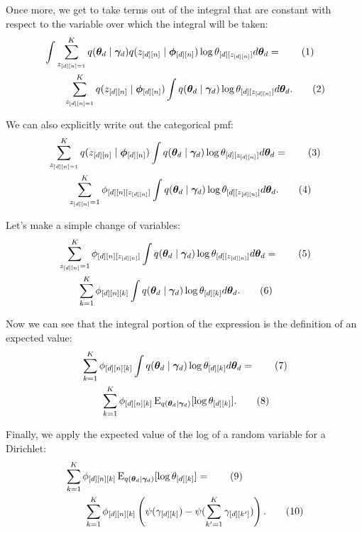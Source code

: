 \documentclass[12pt]{article}
\newcommand\numberthis{\addtocounter{equation}{1}\tag{\theequation}}
\newcommand{\E}{\operatorname{E}}
\begin{document}
Once more, we get to take terms out of the integral that are constant with
respect to the variable over which the integral will be taken:
\begin{align*}
    &\int
    \sum_{z_{[d][n]=1}}^{K}
    q(\bm{\theta}_{d} \mid \bm{\gamma}_{d}) q(z_{[d][n]}
    \mid \bm{\phi}_{[d][n]})\log \theta_{[d][z_{[d][n]}]}
    d\bm{\theta}_{d} = \numberthis \\
    &\quad\quad\sum_{z_{[d][n]=1}}^{K}q(z_{[d][n]} \mid \bm{\phi}_{[d][n]})
    \int q(\bm{\theta}_{d} \mid \bm{\gamma}_{d}) \log \theta_{[d][z_{[d][n]}]}
    d\bm{\theta}_{d}. \numberthis
\end{align*}

We can also explicitly write out the categorical pmf:
\begin{align*}
    &\sum_{z_{[d][n]=1}}^{K}q(z_{[d][n]} \mid \bm{\phi}_{[d][n]})
    \int q(\bm{\theta}_{d} \mid \bm{\gamma}_{d}) \log \theta_{[d][z_{[d][n]}]}
    d\bm{\theta}_{d} = \numberthis \\
    &\quad\quad\sum_{z_{[d][n]}=1}^{K} \phi_{[d][n][z_{[d][n]}]}
    \int q(\bm{\theta}_{d} \mid \bm{\gamma}_{d}) \log \theta_{[d][z_{[d][n]}]}
    d\bm{\theta}_{d}. \numberthis
\end{align*}

Let's make a simple change of variables:
\begin{align*}
    &\sum_{z_{[d][n]}=1}^{K} \phi_{[d][n][z_{[d][n]}]}
    \int q(\bm{\theta}_{d} \mid \bm{\gamma}_{d}) \log \theta_{[d][z_{[d][n]}]}
    d\bm{\theta}_{d} = \numberthis \\
    &\quad\quad\sum_{k=1}^{K} \phi_{[d][n][k]}
    \int q(\bm{\theta}_{d} \mid \bm{\gamma}_{d}) \log \theta_{[d][k]}
    d\bm{\theta}_{d}. \numberthis \\
\end{align*}

Now we can see that the integral portion of the expression is the definition of
an expected value:
\begin{align*}
    &\sum_{k=1}^{K} \phi_{[d][n][k]}
    \int q(\bm{\theta}_{d} \mid \bm{\gamma}_{d}) \log \theta_{[d][k]}
    d\bm{\theta}_{d} = \numberthis \\
    &\quad\quad\sum_{k=1}^{K} \phi_{[d][n][k]}
    \E_{q(\bm{\theta}_{d} \mid \bm{\gamma}_{d})}[ \log \theta_{[d][k]} ]
    . \numberthis \\
\end{align*}

Finally, we apply the expected value of the log of a random variable for a
Dirichlet:
\begin{align*}
    &\sum_{k=1}^{K} \phi_{[d][n][k]}
    \E_{q(\bm{\theta}_{d} \mid \bm{\gamma}_{d})}[ \log \theta_{[d][k]} ]
    = \numberthis \\
    &\quad\quad\sum_{k=1}^{K} \phi_{[d][n][k]}
    \left(\psi(\gamma_{[d][k]}) - \psi(\sum_{k'=1}^{K} \gamma_{[d][k']})\right)
    . \numberthis\label{eq:expectedlogtheta} \\
\end{align*}
\end{document}
